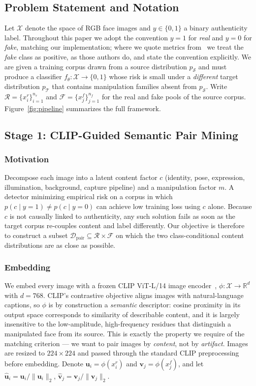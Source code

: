 \documentclass[10pt,journal]{IEEEtran}
\newcommand{\vect}[1]{\boldsymbol{#1}}
\newcommand{\real}{\mathbb{R}}
\begin{document}
\subsection{Problem Statement and Notation}
Let $\mathcal{X}$ denote the space of RGB face images and $y\in\{0,1\}$ a
binary authenticity label. Throughout this paper we adopt the convention
$y=1$ for \emph{real} and $y=0$ for \emph{fake}, matching our implementation;
where we quote metrics from~\cite{bhattacharjee2026caenet} we treat the
\emph{fake} class as positive, as those authors do, and state the convention
explicitly. We are given a training corpus drawn from a source distribution
$p_{\mathcal{S}}$ and must produce a classifier $f_\theta:\mathcal{X}\to\{0,1\}$
whose risk is small under a \emph{different} target distribution
$p_{\mathcal{T}}$ that contains manipulation families absent from
$p_{\mathcal{S}}$. Write $\mathcal{R}=\{x^r_i\}_{i=1}^{n_r}$ and
$\mathcal{F}=\{x^f_j\}_{j=1}^{n_f}$ for the real and fake pools of the source
corpus. Figure~\ref{fig:pipeline} summarizes the full framework.

\subsection{Stage 1: CLIP-Guided Semantic Pair Mining}\label{sec:pairing}

\subsubsection{Motivation}
Decompose each image into a latent content factor $c$ (identity, pose,
expression, illumination, background, capture pipeline) and a manipulation
factor $m$. A detector minimizing empirical risk on a corpus in which
$p(c\mid y{=}1)\neq p(c\mid y{=}0)$ can achieve low training loss using $c$
alone. Because $c$ is not causally linked to authenticity, any such solution
fails as soon as the target corpus re-couples content and label differently.
Our objective is therefore to construct a subset
$\mathcal{D}_{\mathrm{pair}}\subseteq\mathcal{R}\times\mathcal{F}$ on which
the two class-conditional content distributions are as close as possible.

\subsubsection{Embedding}
We embed every image with a frozen CLIP ViT-L/14 image
encoder~\cite{radford2021clip}, $\phi:\mathcal{X}\to\real^{d}$ with $d=768$.
CLIP's contrastive objective aligns images with natural-language captions, so
$\phi$ is by construction a \emph{semantic} descriptor: cosine proximity in
its output space corresponds to similarity of describable content, and it is
largely insensitive to the low-amplitude, high-frequency residues that
distinguish a manipulated face from its source. This is exactly the property
we require of the matching criterion --- we want to pair images by
\emph{content}, not by \emph{artifact}. Images are resized to $224\times224$
and passed through the standard CLIP preprocessing before embedding. Denote
$\vect{u}_i=\phi(x^r_i)$ and $\vect{v}_j=\phi(x^f_j)$, and let
$\hat{\vect{u}}_i=\vect{u}_i/\lVert\vect{u}_i\rVert_2$,
$\hat{\vect{v}}_j=\vect{v}_j/\lVert\vect{v}_j\rVert_2$.
\end{document}
